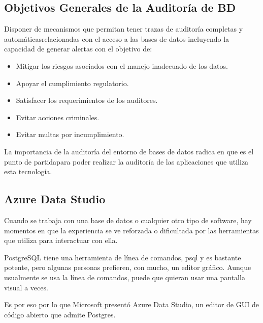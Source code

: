 \begin{flushleft}

\begin{center}
	
	\end{center}
\begin{itemize}
\subsection{Objetivos Generales de la Auditoría de BD}

Disponer de mecanismos que permitan tener trazas de auditoría completas y automáticasrelacionadas con el acceso a las bases de datos incluyendo la capacidad de generar alertas con el objetivo de:

\begin{itemize} \item Mitigar los riesgos asociados con el manejo inadecuado de los datos.
				 \item Apoyar el cumplimiento regulatorio.
				  \item Satisfacer los requerimientos de los auditores.
				  \item Evitar acciones criminales.
				  \item Evitar multas por incumplimiento.
				 				  
				   \end{itemize}



La importancia de la auditoría del entorno de bases de datos radica en que es el punto de partidapara poder realizar la auditoría de las aplicaciones que utiliza esta tecnología.



\subsection{Azure Data Studio}

Cuando se trabaja con una base de datos o cualquier otro tipo de software, hay momentos en que la experiencia se ve reforzada o dificultada por las herramientas que utiliza para interactuar con ella.

PostgreSQL tiene una herramienta de línea de comandos, psql y es bastante potente, pero algunas personas prefieren, con mucho, un editor gráfico. Aunque usualmente se usa la línea de comandos, puede que quieran usar una pantalla visual a veces.


Es por eso por lo que Microsoft presentó Azure Data Studio, un editor de GUI de código abierto que admite Postgres.


\end{itemize}
\end{flushleft}
